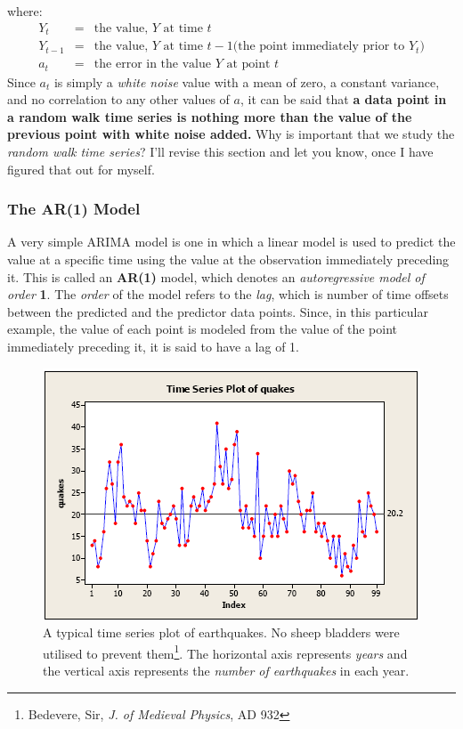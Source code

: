 \documentclass[12pt]{article}
\begin{document}
where:
\begin{eqnarray}
Y_t & = & \textrm{the value, } Y \textrm{ at time } t \nonumber \\
Y_{t-1} & = & \textrm{the value, } Y \textrm{ at time } t-1 \textrm{(the point immediately prior to $Y_t$)} \nonumber \\
a_t & = & \textrm{the error in the value $Y$ at point } t \nonumber
\end{eqnarray}
Since $a_t$ is simply a \textit{white noise} value with a mean of zero, a constant variance, and no correlation to any other values of $a$, it can be said that \textbf{a data point in a random walk time series is nothing more than the value of the previous point with white noise added.} Why is important that we study the \textit{random walk time series}? I'll revise this section and let you know, once I have figured that out for myself.


\subsubsection{The AR(1) Model}
A very simple ARIMA model is one in which a linear model is used to predict the value at a specific time using the value at the observation immediately preceding it. This is called an \textbf{AR(1)} model, which denotes an \textit{autoregressive model of order} \textbf{1}. The \textit{order} of the model refers to the \textit{lag}, which is number of time offsets between the predicted and the predictor data points. Since, in this particular example, the value of each point is modeled from the value of the point immediately preceding it, it is said to have a lag of 1.


\begin{figure}
\begin{minipage}{\textwidth}
	\includegraphics[width=\textwidth, keepaspectratio]{TimeSeriesArima1.png}
	\caption[dafuq]{A typical time series plot of earthquakes. No sheep bladders were utilised to prevent them\footnote{Bedevere, Sir, \textit{J. of Medieval Physics}, AD 932}. The horizontal axis represents \textit{years} and the vertical axis represents the \textit{number of earthquakes} in each year.}
	\label{fig:arima1}
\end{minipage}
\end{figure}
\end{document}
